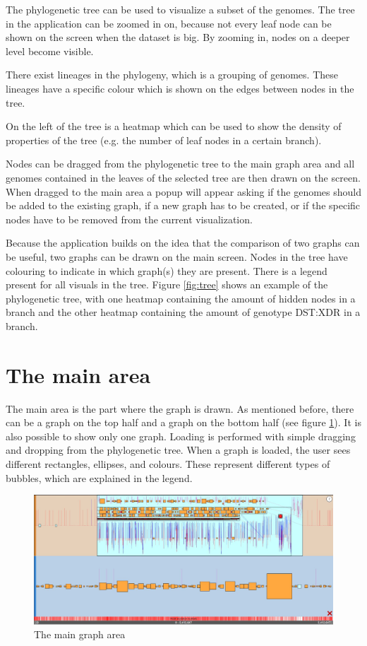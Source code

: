 The phylogenetic tree can be used to visualize a subset of the genomes. The tree in the application can be zoomed in on, because not every leaf node can be shown on the screen when the dataset is big. By zooming in, nodes on a deeper level become visible. 
\par
There exist lineages in the phylogeny, which is a grouping of genomes. These lineages have a specific colour which is shown on the edges between nodes in the tree. 
\par
On the left of the tree is a heatmap which can be used to show the density of properties of the tree (e.g. the number of leaf nodes in a certain branch). 
\par
Nodes can be dragged from the phylogenetic tree to the main graph area and all genomes contained in the leaves of the selected tree are then drawn on the screen. When dragged to the main area a popup will appear asking if the genomes should be added to the existing graph, if a new graph has to be created, or if the specific nodes have to be removed from the current visualization. 
\par
Because the application builds on the idea that the comparison of two graphs can be useful, two graphs can be drawn on the main screen. Nodes in the tree have colouring to indicate in which graph(s) they are present. There is a legend present for all visuals in the tree. 
Figure \ref{fig:tree} shows an example of the phylogenetic tree, with one heatmap containing the amount of hidden nodes in a branch and the other heatmap containing the amount of genotype DST:XDR in a branch.
\section{The main area}
The main area is the part where the graph is drawn. As mentioned before, there can be a graph on the top half and a graph on the bottom half (see figure \ref{fig:graph}). It is also possible to show only one graph. Loading is performed with simple dragging and dropping from the phylogenetic tree. When a graph is loaded, the user sees different rectangles, ellipses, and colours. These represent different types of bubbles, which are explained in the legend. 

\begin{figure}[ht]
	\centering
	\vspace*{-2cm} %
	\includegraphics[width=\textwidth]{images/graph.jpg}
	\caption{\label{fig:graph}The main graph area}
\end{figure}


